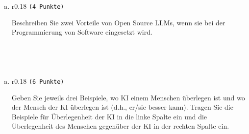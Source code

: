 \documentclass[12pt, ngerman]{AssignmentClass}
\begin{document}
    \begin{enumerate}[b)]
		\item 
			\begin{minipage}[t]{\linewidth}
				\vspace{-0.61em}
				\begin{wrapfigure}[2]{r}{0.18\linewidth} 
					\raggedleft
					\texttt{(4 Punkte)}
				\end{wrapfigure}
                Beschreiben Sie zwei Vorteile von Open Source LLMs, wenn sie bei der Programmierung von Software eingesetzt wird.
			\end{minipage}
	\end{enumerate}
 
    \begin{answerbox}
		\noindent
		\fbox{\parbox[c]{\textwidth}{
				\vspace{4cm}
				\hspace{\textwidth}
		}}\\
	\end{answerbox}

	\begin{solution}
		\noindent
		\\
	\end{solution}

    \begin{enumerate}[c)]
		\item 
			\begin{minipage}[t]{\linewidth}
				\vspace{-0.61em}
				\begin{wrapfigure}[2]{r}{0.18\linewidth} 
					\raggedleft
					\texttt{(6 Punkte)}
				\end{wrapfigure}
                Geben Sie jeweils drei Beispiele, wo KI einem Menschen überlegen ist und wo der Mensch der KI überlegen ist (d.h., er/sie besser kann).  Tragen Sie die Beispiele für Überlegenheit der KI in die linke Spalte ein und die Überlegenheit des Menschen gegenüber der KI in der rechten Spalte ein.                
			\end{minipage}
	\end{enumerate}
\end{document}
